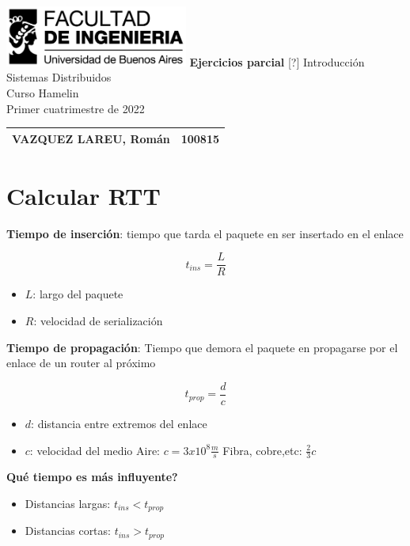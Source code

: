 \documentclass[titlepage,a4paper]{article}
\begin{document}
\begin{titlepage} %
	\hfill\includegraphics[width=6cm]{logofiuba.jpg}
    \centering
    \vfill
    \Huge \textbf{Ejercicios parcial}
    \vskip2cm
    \Large [?]  Introducción Sistemas Distribuidos\\
    Curso Hamelin \\ 
    Primer cuatrimestre de 2022 
    \vfill
    \begin{tabular}{ | l | l | } %
      \hline
      VAZQUEZ LAREU, Román & 100815 \\ \hline
      

  	\end{tabular}
    \vfill
    \vfill
\end{titlepage}

\tableofcontents %
\newpage

\section{Calcular RTT}\label{sec:CalcularRTT}

\textbf{Tiempo de inserción}: tiempo que tarda el paquete en ser insertado en el enlace

$$t_{ins} = \frac{L}{R}$$ 

\begin{itemize}
    \item $L$: largo del paquete
    \item $R$: velocidad de serialización
\end{itemize}


\textbf{Tiempo de propagación}: Tiempo que demora el paquete en propagarse por el enlace de un router al próximo

$$t_{prop} = \frac{d}{c}$$

\begin{itemize}
    \item $d$: distancia entre extremos del enlace
    \item $c$: velocidad del medio
        \subitem Aire: $c = 3x10^8 \frac{m}{s}$
        \subitem Fibra, cobre,etc: $\frac{2}{3} c$ 
\end{itemize}


\textbf{Qué tiempo es más influyente?}
\begin{itemize}
    \item Distancias largas: $ t_{ins} <  t_{prop} $
    \item Distancias cortas: $ t_{ins} > t_{prop}$
\end{itemize}
\end{document}
